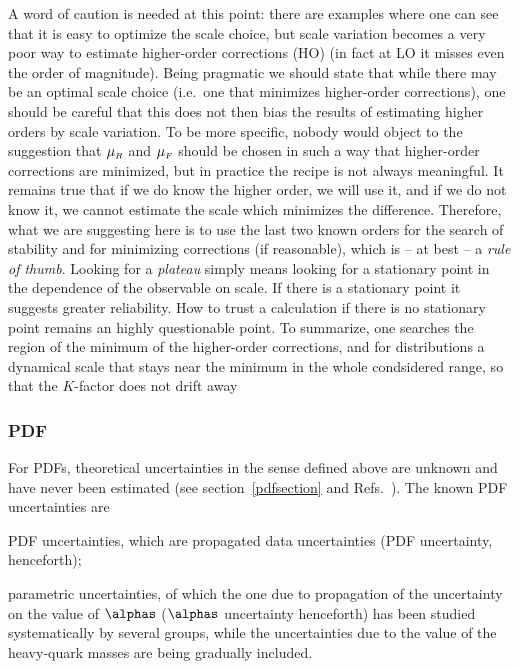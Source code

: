 A word of caution is needed at this point: there are examples where one can see
that it is easy to optimize the scale choice, but scale variation becomes a very 
poor way to estimate higher-order corrections (HO) (in fact at LO it misses even 
the order of magnitude).
Being pragmatic we should state that while there may be an optimal scale choice 
(i.e.\ one that minimizes higher-order corrections), one should be careful that 
this does not then bias the results of estimating higher orders by scale variation.
To be more specific, nobody would object to the suggestion that $\mu_{{\scriptscriptstyle{R}}}$ and
$\mu_{{\scriptscriptstyle{F}}}$ should be chosen in such a way that higher-order corrections are
minimized, but in practice the recipe is not always meaningful. It remains true that
if we do know the higher order, we will use it, and if we do not know it, we cannot 
estimate the scale which minimizes the difference. Therefore, what we are suggesting
here is to use the last two known orders for the search of stability and for
minimizing corrections (if reasonable), which is -- at best -- a 
{\em rule of thumb}.
Looking for a {\em plateau} simply means looking for a stationary point in the 
dependence of the observable on scale. If there is a stationary point it suggests 
greater reliability. How to trust a calculation if there is no stationary point 
remains an highly questionable point.
To summarize, one searches the region of the minimum of the
higher-order corrections, and for distributions
a dynamical scale that stays near the minimum in the whole
condsidered range, so that the $K$-factor does not drift away


\subsubsection{PDF}
For PDFs, theoretical uncertainties in the sense defined above are unknown and 
have never been estimated (see section~\ref{pdfsection} and  
Refs.~\cite{forterev,PDF4LHCwebpage,PDF4LHCwiki}). The known PDF uncertainties are
\bei
\item PDF uncertainties, which are propagated data uncertainties (PDF
  uncertainty, henceforth); 
\item parametric uncertainties, of which the one due to propagation of
  the uncertainty on the value of $\alphas$ ($\alphas$ uncertainty henceforth)
has been studied systematically
by several groups, while the uncertainties due to the value of the
heavy-quark masses are being gradually included.
\eei

